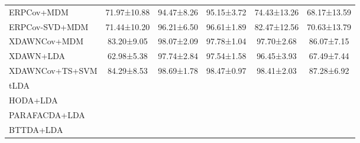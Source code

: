 \begin{tabularx}{\textwidth}{lccccc}
\midrule
ERPCov+MDM            & 71.97±10.88 & 94.47±8.26 & 95.15±3.72 & 74.43±13.26 & 68.17±13.59 \\
ERPCov-SVD+MDM  & 71.44±10.20 & 96.21±6.50 & 96.61±1.89 & 82.47±12.56 & 70.63±13.79 \\
XDAWNCov+MDM          & 83.20±9.05 & 98.07±2.09 & 97.78±1.04 & 97.70±2.68 & 86.07±7.15 \\
XDAWN+LDA             & 62.98±5.38 & 97.74±2.84 & 97.54±1.58 & 96.45±3.93 & 67.49±7.44 \\
XDAWNCov+TS+SVM       & 84.29±8.53 & 98.69±1.78 & 98.47±0.97 & 98.41±2.03 & 87.28±6.92 \\
tLDA                  & & & & & \\ \midrule
HODA+LDA                  & & & & &  \\
PARAFACDA+LDA             & & & & &  \\
BTTDA+LDA                 & & & & &  \\
\bottomrule
\end{tabularx}
